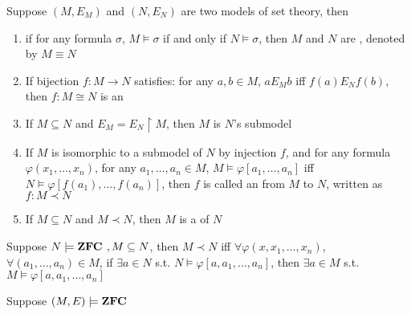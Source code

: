 \documentclass[11pt]{article}
\begin{document}
\begin{definition}[]
Suppose \((M,E_M)\) and \((N,E_N)\) are two models of set theory, then
\begin{enumerate}
\item if for any formula \(\sigma\), \(M\models\sigma\) if and only if
\(N\models\sigma\), then \(M\) and \(N\) are , denoted
by \(M\equiv N\)
\item If bijection \(f:M\to N\) satisfies: for any \(a,b\in M\), \(aE_Mb\) iff
\(f(a)E_Nf(b)\), then \(f:M\cong N\) is an 
\item If \(M\subseteq N\) and \(E_M=E_N\restriction M\), then \(M\) is \(N\)'s submodel
\item If \(M\) is isomorphic to a submodel of \(N\) by injection \(f\), and for any
formula \(\varphi(x_1,\dots,x_n)\), for any \(a_1,\dots,a_n\in M\), 
\(M\models\varphi[a_1,\dots,a_n]\) iff
\(N\models\varphi[f(a_1),\dots,f(a_n)]\), then \(f\) is called an
 from \(M\) to \(N\), written as \(f:M\prec N\)
\item If \(M\subseteq N\) and \(M\prec N\), then \(M\) is a 
of \(N\)
\end{enumerate}
\end{definition}

\begin{lemma}[]
Suppose \(N\models\textbf{ZFC },M\subseteq N\), then \(M\prec N\) iff
\(\forall\varphi(x,x_1,\dots,x_n)\), \(\forall(a_1,\dots,a_n)\in M\), if 
\(\exists a\in N\) s.t. \(N\models\varphi[a,a_1,\dots,a_n]\), then \(\exists a\in
  M\) s.t. 
\(M\models\varphi[a,a_1,\dots,a_n]\)
\end{lemma}

\begin{definition}[]
Suppose \((M,E)\models\textbf{ZFC }\)
\end{definition}
\end{document}

